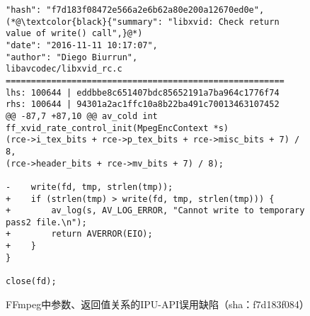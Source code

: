 \begin{figure}[t]
	\centering
\begin{lstlisting}
"hash": "f7d183f08472e566a2e6b62a80e200a12670ed0e",
(*@\textcolor{black}{"summary": "libxvid: Check return value of write() call",}@*)
"date": "2016-11-11 10:17:07",
"author": "Diego Biurrun",
libavcodec/libxvid_rc.c
=======================================================
lhs: 100644 | eddbbe8c651407bdc85652191a7ba964c1776f74
rhs: 100644 | 94301a2ac1ffc10a8b22ba491c70013463107452
@@ -87,7 +87,10 @@ av_cold int ff_xvid_rate_control_init(MpegEncContext *s)
(rce->i_tex_bits + rce->p_tex_bits + rce->misc_bits + 7) / 8,
(rce->header_bits + rce->mv_bits + 7) / 8);

-    write(fd, tmp, strlen(tmp));
+    if (strlen(tmp) > write(fd, tmp, strlen(tmp))) {
+        av_log(s, AV_LOG_ERROR, "Cannot write to temporary pass2 file.\n");
+        return AVERROR(EIO);
+    }
}

close(fd);

\end{lstlisting}
	\caption{
	FFmpeg中参数、返回值关系的IPU-API误用缺陷（sha：f7d183f084）
	}
	\label{fig:2-3-ipu-2}
\end{figure}